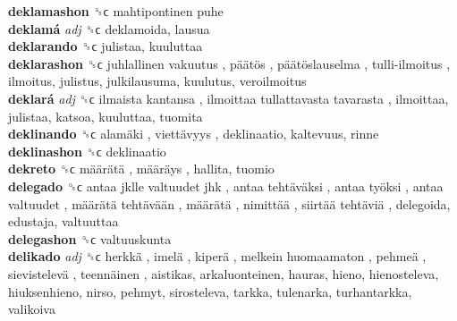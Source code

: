 \textbf{deklamashon} ␝ϲ   mahtipontinen puhe   \\
\textbf{deklamá} \emph{adj}  ␝ϲ  deklamoida, lausua  \\
\textbf{deklarando} ␝ϲ  julistaa, kuuluttaa  \\
\textbf{deklarashon} ␝ϲ   juhlallinen vakuutus ,  päätös ,  päätöslauselma ,  tulli-ilmoitus , ilmoitus, julistus, julkilausuma, kuulutus, veroilmoitus  \\
\textbf{deklará} \emph{adj}  ␝ϲ   ilmaista kantansa ,  ilmoittaa tullattavasta tavarasta , ilmoittaa, julistaa, katsoa, kuuluttaa, tuomita  \\
\textbf{deklinando} ␝ϲ   alamäki ,  viettävyys , deklinaatio, kaltevuus, rinne  \\
\textbf{deklinashon} ␝ϲ  deklinaatio  \\
\textbf{dekreto} ␝ϲ   määrätä ,  määräys , hallita, tuomio  \\
\textbf{delegado} ␝ϲ   antaa jklle valtuudet jhk ,  antaa tehtäväksi ,  antaa työksi ,  antaa valtuudet ,  määrätä tehtävään ,  määrätä ,  nimittää ,  siirtää tehtäviä , delegoida, edustaja, valtuuttaa  \\
\textbf{delegashon} ␝ϲ  valtuuskunta  \\
\textbf{delikado} \emph{adj}  ␝ϲ   herkkä ,  imelä ,  kiperä ,  melkein huomaamaton ,  pehmeä ,  sievistelevä ,  teennäinen , aistikas, arkaluonteinen, hauras, hieno, hienosteleva, hiuksenhieno, nirso, pehmyt, sirosteleva, tarkka, tulenarka, turhantarkka, valikoiva  \\

